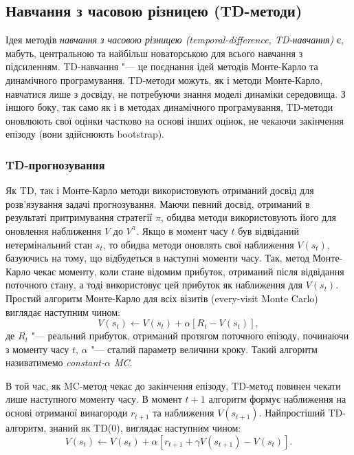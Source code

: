 \subsection{Навчання з часовою різницею (TD-методи)}

Ідея методів \emph{навчання з часовою різницею (temporal-difference, TD-навчання)} є, мабуть, центральною та найбільш новаторською для всього навчання з підсиленням. TD-навчання "--- це поєднання ідей методів Монте-Карло та динамічного програмування. TD-методи можуть, як і методи Монте-Карло, навчатися лише з досвіду, не потребуючи знання моделі динаміки середовища. З іншого боку, так само як і в методах динамічного програмування, TD-методи оновлюють свої оцінки частково на основі інших оцінок, не чекаючи закінчення епізоду (вони здійснюють bootstrap).

\subsubsection{TD-прогнозування}

Як TD, так і Монте-Карло методи використовують отриманий досвід для розв'язування задачі прогнозування. Маючи певний досвід, отриманий в результаті притримування стратегії $\pi$, обидва методи використовують його для оновлення наближення $V$ до $V^\pi$. Якщо в момент часу $t$ був відвіданий нетермінальний стан $s_t$, то обидва методи оновлять свої наближення $V(s_t)$, базуючись на тому, що відбудеться в наступні моменти часу. Так, метод Монте-Карло чекає моменту, коли стане відомим прибуток, отриманий після відвідання поточного стану, а тоді використовує цей прибуток як наближення для $V(s_t)$. Простий алгоритм Монте-Карло для всіх візитів (every-visit Monte Carlo) виглядає наступним чином:
\begin{equation}
V(s_t) \leftarrow V(s_t) + \alpha\left[R_t - V(s_t)\right],
\end{equation}
де $R_t$ "--- реальний прибуток, отриманий протягом поточного епізоду, починаючи з моменту часу $t$, $\alpha$ "--- сталий параметр величини кроку. Такий алгоритм називатимемо \emph{constant-$\alpha$ MC}.

В той час, як MC-метод чекає до закінчення епізоду, TD-метод повинен чекати лише наступного моменту часу. В момент $t+1$ алгоритм формує наближення на основі отриманої винагороди $r_{t+1}$ та наближення $V(s_{t+1})$. Найпростіший TD-алгоритм, знаний як TD(0), виглядає наступним чином:
\begin{equation}
V(s_t) \leftarrow V(s_t) + \alpha\left[r_{t+1} + \gamma V(s_{t+1}) - V(s_t)\right].
\end{equation}

